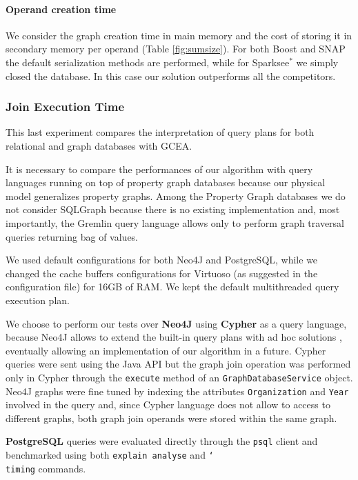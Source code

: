 \paragraph*{Operand creation time}
We consider the graph creation time in main memory
and the cost of storing it in secondary memory
per operand (Table \ref{fig:sumsize}). For both Boost and SNAP the default
serialization methods are performed, while for
Sparksee$^*$ we simply closed the database. In this case our solution outperforms all the competitors.


\subsubsection{Join Execution Time}\label{sec:qplan}
This last experiment compares the interpretation of query plans for both relational
and graph databases with  GCEA. %

It is necessary to compare the performances of our algorithm with query languages running on top of property graph
databases because our physical model generalizes property graphs. Among the Property Graph
databases  we do
not consider SQLGraph  \cite{SQLGraph} because there
is no existing implementation and, most importantly, the Gremlin query language allows
only to perform graph traversal queries returning bag of values.

We used default configurations for both Neo4J and PostgreSQL, while we changed the
cache buffers configurations for Virtuoso (as suggested in the configuration file) for
16GB of RAM. We kept the default multithreaded query execution plan.

We choose to
perform our tests over \textbf{Neo4J} using \textbf{Cypher} as a query language, because Neo4J allows to extend the built-in
query plans with ad hoc solutions \cite{Neo4jAlg}, eventually allowing an implementation of
our algorithm in a future.
Cypher queries
were sent using the Java API but the graph join operation was performed only in
Cypher through the \texttt{execute} method of an \texttt{Graph\-Database\-Service}
object.
Neo4J graphs were fine tuned by indexing the attributes \texttt{Organization}
and \texttt{Year} involved in the query and, since Cypher language does not allow to
access to different graphs, both graph join operands were stored within the same graph.

\textbf{PostgreSQL} queries were evaluated directly through
the \texttt{psql} client and benchmarked using both \texttt{explain analyse} and
\texttt{\char`\\timing} commands.

